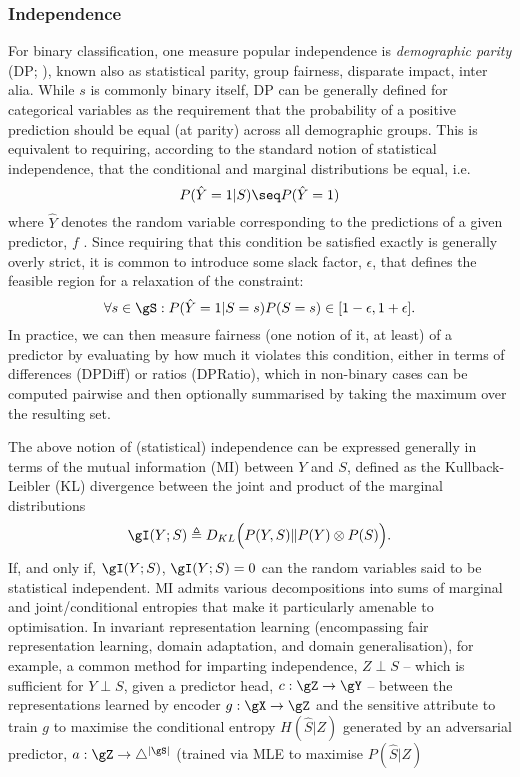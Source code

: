 \subsubsection{Independence}
%
For binary classification, one measure popular independence is \emph{demographic parity} (DP;
\cite{zemel2013learning, feldman2015certifying}),
known also as statistical parity, group fairness, disparate impact, inter alia. 
%
While \(s\) is commonly binary itself, DP can be generally defined for categorical variables as the
requirement that the probability of a positive prediction should be equal (at parity) across all
demographic groups. 
%
This is equivalent to requiring, according to the standard notion of statistical independence, that
the conditional and marginal distributions be equal, i.e.
%
\begin{equation}
    P( \hat{Y} = 1 | S) \seq P( \hat{Y} = 1 )
\end{equation}
%
where \(\hat{Y}\) denotes the random variable corresponding to the predictions of a given
predictor, \(f\) .
%
Since requiring that this condition be satisfied exactly is generally overly strict, it is common
to introduce some slack factor, \(\epsilon\), that defines the feasible region for a relaxation of
the constraint:
%
\begin{equation} \forall s \in \gS: P(\hat{Y}=1|S=s) P(S=s)
    \in 
[ 1 - \epsilon, 1 + \epsilon ]. \end{equation}
%
In practice, we can then measure fairness (one notion of it, at least) of a predictor by evaluating
by how much it violates this condition, either in terms of differences (DPDiff) or ratios
(DPRatio), which in non-binary cases can be computed pairwise and then optionally summarised by
taking the maximum over the resulting set.

The above notion of (statistical) independence can be expressed generally  in terms of the mutual
information (MI) between \(Y\) and \(S\), defined as the Kullback-Leibler (KL) divergence between
the joint and product of the marginal distributions
%
\begin{equation}
    \gI(Y;S) \triangleq D_{KL} \Bigl( P(Y, S) \Vert P(Y) \otimes P(S) \Bigr).
\end{equation}
%
If, and only if, \( \gI(Y;S)\), \( \gI(Y;S) = 0  \) can the random variables said to be
statistical independent.
%
MI admits various decompositions into sums of marginal and joint/conditional entropies that make it
particularly amenable to optimisation. 
%
In invariant representation learning (encompassing fair representation learning, domain adaptation,
and domain generalisation), for example, a common method for imparting independence, \(Z \perp S \)
-- which is sufficient for \(Y \perp S\), given a predictor head, \(c: \gZ \to \gY \) -- between
the representations learned by encoder \(g: \gX \to \gZ \) and the sensitive attribute to train
\(g\) to maximise the conditional entropy \( H(\hat{S}|Z) \) generated by an adversarial predictor,
\(a: \gZ \to \bigtriangleup^{|\gS|}\) (trained via MLE to maximise \( P(\hat{S}|Z) \)

